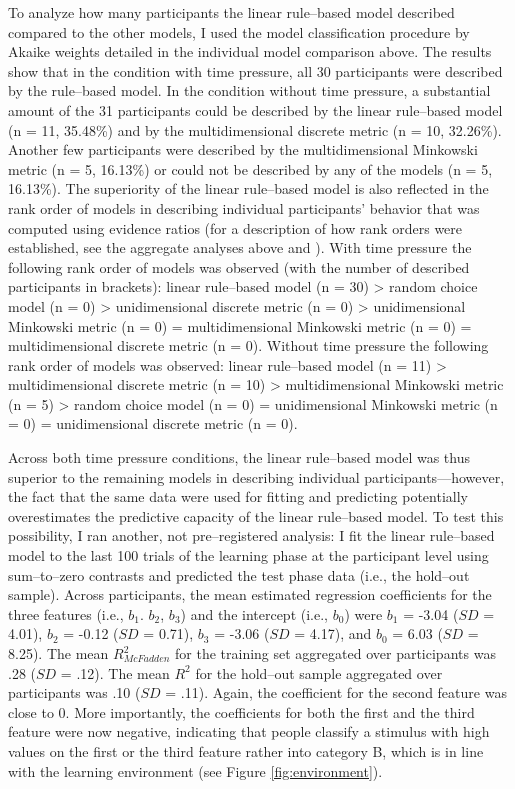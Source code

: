 \documentclass[a4paper,man,natbib]{apa6}
\begin{document}
To analyze how many participants the linear rule--based model described compared to the other models, I used the model classification procedure by Akaike weights detailed in the individual model comparison above. The results show that in the condition with time pressure, all 30 participants were described by the rule--based model. In the condition without time pressure, a substantial amount of the 31 participants could be described by the linear rule--based model (n = 11, 35.48\%) and by the multidimensional discrete metric (n = 10, 32.26\%). Another few participants were described by the multidimensional Minkowski metric (n = 5, 16.13\%) or could not be described by any of the models (n = 5, 16.13\%). 
The superiority of the linear rule--based model is also reflected in the rank order of models in describing individual participants' behavior that was computed using evidence ratios (for a description of how rank orders were established, see the aggregate analyses above and \citealp{wagenmakers2004aic}). With time pressure the following rank order of models was observed (with the number of described participants in brackets): linear rule--based model (n = 30) > random choice model (n = 0) > unidimensional discrete metric (n = 0) > unidimensional Minkowski metric (n = 0) = multidimensional Minkowski metric (n = 0) = multidimensional discrete metric (n = 0). Without time pressure the following rank order of models was observed: linear rule--based model (n = 11) > multidimensional discrete metric (n = 10) > multidimensional Minkowski metric (n = 5) > random choice model (n = 0) = unidimensional Minkowski metric (n = 0) = unidimensional discrete metric (n = 0).

Across both time pressure conditions, the linear rule--based model was thus superior to the remaining models in describing individual participants---however, the fact that the same data were used for fitting and predicting potentially overestimates the predictive capacity of the linear rule--based model. To test this possibility, I ran another, not pre--registered analysis: I fit the linear rule--based model to the last 100 trials of the learning phase at the participant level using sum--to--zero contrasts and predicted the test phase data (i.e., the hold--out sample). Across participants, the mean estimated regression coefficients for the three features (i.e., $b_1$. $b_2$, $b_3$) and the intercept (i.e., $b_0$) were $b_1$ = -3.04 ($SD$ = 4.01), $b_2$ = -0.12 ($SD$ = 0.71), $b_3$ = -3.06 ($SD$ = 4.17), and $b_0$ = 6.03 ($SD$ = 8.25). The mean $R_{McFadden}^2$ for the training set aggregated over participants was .28 ($SD$ = .12). The mean $R^2$ for the hold--out sample aggregated over participants was .10 ($SD$ = .11).
Again, the coefficient for the second feature was close to 0. More importantly, the coefficients for both the first and the third feature were now negative, indicating that people classify a stimulus with high values on the first or the third feature rather into category B, which is in line with the learning environment (see Figure \ref{fig:environment}).
\end{document}
